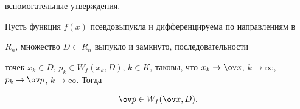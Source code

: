 вспомогательные утверждения.








\begin{lem}\label{l3}


Пусть функция $f(x)$ псевдовыпукла и дифференцируема по направлениям в


$R_n$, множество $D\subset R_n$ выпукло и замкнуто, последовательности


точек $x_k\in D$, $p_k\in W_f(x_k, D)$, $k\in K$, таковы, что $x_k \to \ov


x$, $k\to \infty$, $p_k\to \ov p$, $k\to \infty$. Тогда




\begin{equation} \label{r18}


\ov p\in W_f(\ov x,D).


\end{equation}


%


\end{lem}





